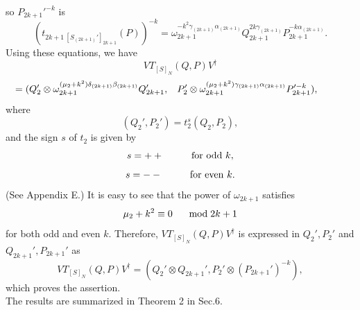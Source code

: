 \documentclass[12pt]{iopart}
\begin{document}
so
\(P_{2k+1}'^{-k}\) is 
\begin{equation}
(t_{2k+1\ [S_{(2k+1)}']_{2k+1}}(P))^{-k}
=
\omega_{2k+1}^{-k^2\gamma_{(2k+1)}\alpha_{(2k+1)}}
Q_{2k+1}^{2k\gamma_{(2k+1)}}
P_{2k+1}^{-k\alpha_{(2k+1)}}.
\end{equation}
%
Using these equations, we have
\[
VT_{[S]_N}(Q,P)V^\dagger
\]
\begin{equation}
\hspace{-10mm}
=
(
Q_2'
\otimes
\omega_{2k+1}^{(\mu_2+k^2)\delta_{(2k+1)}\beta_{(2k+1)}}
Q_{2k+1}',
\hspace{3mm}
P_2'
\otimes
\omega_{2k+1}^{(\mu_2+k^2)\gamma_{(2k+1)}\alpha_{(2k+1)}}
P_{2k+1}'^{-k}),
\end{equation}
%
where
\begin{equation}
(Q_2',P_2')=t_2^s(Q_2,P_2),
\end{equation}
and the sign \(s\) of \(t_2\) is given by
\begin{equation}
s=++\hspace{10mm}{\rm for\ odd}\ k,
\end{equation}
\begin{equation}
s=--\hspace{10mm}{\rm for\ even}\ k.
\end{equation}
(See Appendix E.)
%
It is easy to see that the power of \(\omega_{2k+1}\) satisfies
\begin{equation}
\mu_2+k^2\equiv0
\hspace{5mm}\bmod 2k+1
\end{equation}
for both odd and even \(k\).
%
Therefore,
\(VT_{[S]_N}(Q,P)V^\dagger\) is expressed in \(Q_2',P_2'\) and \(Q_{2k+1}',P_{2k+1}'\) as
\begin{equation}
VT_{[S]_N}(Q,P)V^\dagger
=
(Q_2'\otimes Q_{2k+1}',P_2'\otimes(P_{2k+1}')^{-k}),
\end{equation}
which proves the assertion.
\\

The results are summarized in Theorem 2 in Sec.6.
\end{document}
